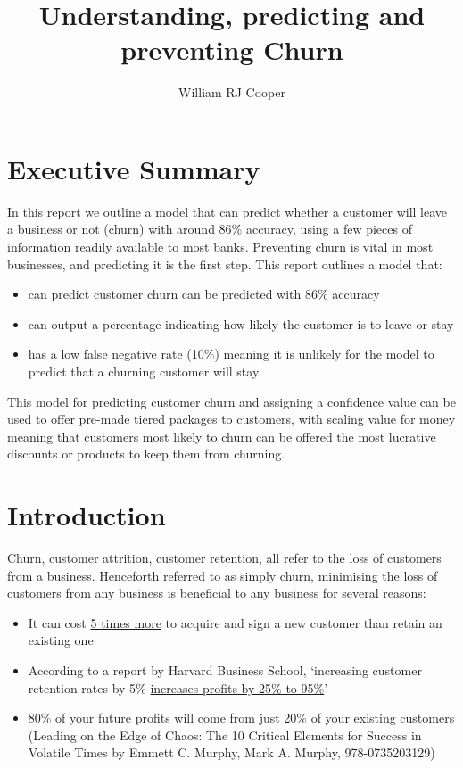 \documentclass[]{article}
\title{Understanding, predicting and preventing Churn}
\author{William RJ Cooper}
\newcommand{\winningaccuracy}{86\%\xspace}
\newcommand{\winningfnrate}{10\%\xspace}
\begin{document}
\maketitle

\section{Executive Summary}

In this report we outline a model that can predict whether a customer will leave a business or not (churn) with around \winningaccuracy accuracy, using a few pieces of information readily available to most banks. Preventing churn is vital in most businesses, and predicting it is the first step. This report outlines a model that:

\begin{itemize}
	\item can predict customer churn can be predicted with \winningaccuracy accuracy
	\item can output a percentage indicating how likely the customer is to leave or stay
	\item has a low false negative rate (\winningfnrate) meaning it is unlikely for the model to predict that a churning customer will stay
\end{itemize}

This model for predicting customer churn and assigning a confidence value can be used to offer pre-made tiered packages to customers, with scaling value for money meaning that customers most likely to churn can be offered the most lucrative discounts or products to keep them from churning.

\section{Introduction}

Churn, customer attrition, customer retention, all refer to the loss of customers from a business. Henceforth referred to as simply churn, minimising the loss of customers from any business is beneficial to any business for several reasons:

\begin{itemize}
	\item It can cost \href{https://www.forbes.com/sites/jiawertz/2018/09/12/dont-spend-5-times-more-attracting-new-customers-nurture-the-existing-ones/#47efa3d45a8e}{5 times more} to acquire and sign a new customer than retain an existing one
	\item According to a report by Harvard Business School, ‘increasing customer retention rates by 5\% \href{https://hbswk.hbs.edu/archive/the-economics-of-e-loyalty}{increases profits by 25\% to 95\%}’
	\item 80\% of your future profits will come from just 20\% of your existing customers (Leading on the Edge of Chaos: The 10 Critical Elements for Success in Volatile Times by Emmett C. Murphy, Mark A. Murphy, 978-0735203129)
\end{itemize}
\end{document}
